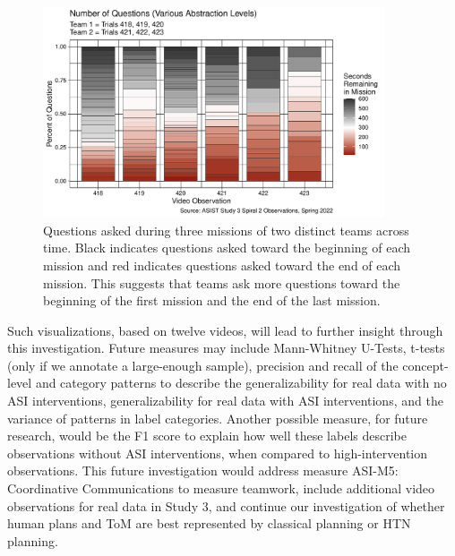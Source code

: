 \begin{figure}[h]
    \centering
    \includegraphics[width=0.9\textwidth]{images/prelim_percent_questions.pdf}
    \caption{Questions asked during three missions of two distinct teams across
    time. Black indicates questions asked toward the beginning of each mission
  and red indicates questions asked toward the end of each mission. This 
suggests that teams ask more questions toward the beginning of the
first mission and the end of the last mission.}
\end{figure}


Such visualizations, based on twelve videos, will lead to further insight
through this investigation. Future measures may include Mann-Whitney U-Tests,
t-tests (only if we annotate a large-enough sample), precision and recall of
the concept-level and category patterns to describe the generalizability for
real data with no ASI interventions, generalizability for real data with ASI
interventions, and the variance of patterns in label categories. Another
possible measure, for future research, would be the F1 score to explain how
well these labels describe observations without ASI interventions, when
compared to high-intervention observations. This future investigation would
address measure ASI-M5: Coordinative Communications to
measure teamwork, include additional video observations for real data in Study
3, and continue our investigation of whether human plans and ToM are best
represented by classical planning or HTN planning.


